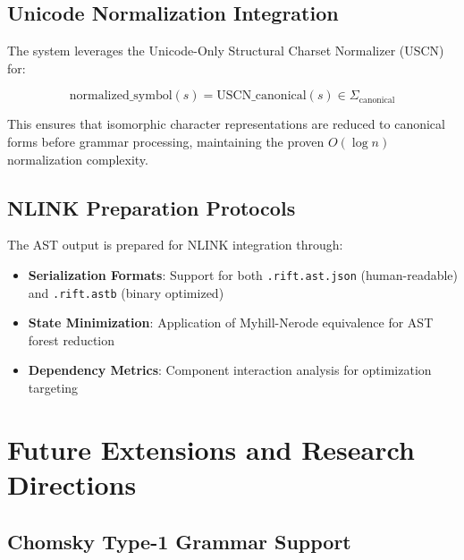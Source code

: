 \documentclass[11pt,a4paper]{article}
\theoremstyle{definition}
\theoremstyle{remark}
\begin{document}
\subsection{Unicode Normalization Integration}
\label{subsec:unicode-integration}

The system leverages the Unicode-Only Structural Charset Normalizer (USCN) for:

\begin{equation}
\text{normalized\_symbol}(s) = \text{USCN\_canonical}(s) \in \Sigma_{\text{canonical}}
\end{equation}

This ensures that isomorphic character representations are reduced to canonical forms before grammar processing, maintaining the proven $O(\log n)$ normalization complexity.

\subsection{NLINK Preparation Protocols}
\label{subsec:nlink-preparation}

The AST output is prepared for NLINK integration through:

\begin{itemize}
\item \textbf{Serialization Formats}: Support for both \texttt{.rift.ast.json} (human-readable) and \texttt{.rift.astb} (binary optimized)
\item \textbf{State Minimization}: Application of Myhill-Nerode equivalence for AST forest reduction
\item \textbf{Dependency Metrics}: Component interaction analysis for optimization targeting
\end{itemize}


\section{Future Extensions and Research Directions}
\label{sec:future-extensions}

\subsection{Chomsky Type-1 Grammar Support}
\label{subsec:chomsky-type1}
\end{document}
